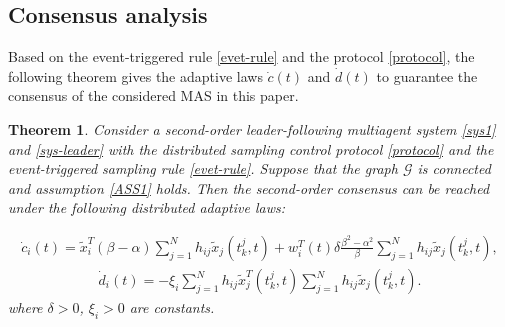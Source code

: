 \documentclass[review]{elsarticle}
\newtheorem{thm}{Theorem}
\begin{document}
\subsection{Consensus analysis}\label{consensusanalysis}
Based on the event-triggered rule \eqref{evet-rule} and the protocol \eqref{protocol}, the following theorem gives the adaptive laws $\dot c(t)$ and $\dot d(t)$ to guarantee the consensus of the considered MAS in this paper.
\begin{thm}\label{thm1}
	Consider a second-order leader-following multiagent system \eqref{sys1} and \eqref{sys-leader} with the distributed sampling control protocol \eqref{protocol} and the event-triggered sampling rule \eqref{evet-rule}. Suppose that the graph $\mathcal{G}$ is connected and assumption \ref{ASS1}	holds. Then the second-order consensus can be reached under the following distributed adaptive laws:
	
	\begin{eqnarray}\label{dotc}
	\dot c_i(t) =   \tilde{x}_i^T (\beta - \alpha)\sum_{j=1}^{N}h_{ij} \tilde{x}_j(t_k^j,t) + w_i^T(t)\delta \frac{\beta^2 - \alpha^2}{\beta} \sum_{j=1}^{N}h_{ij} \tilde{x}_j(t_k^j,t)  ,
	\end{eqnarray}
	\begin{eqnarray}\label{dotd}	
	\dot d_i(t) = - \xi_i\sum_{j=1}^{N}h_{ij} \tilde{x}_j^T(t^j_k,t)\sum_{j=1}^{N}h_{ij} \tilde{x}_j (t^j_k,t).
	\end{eqnarray}
	where $\delta >0$,  $\xi_i>0$ are constants. 
\end{thm}
\end{document}
